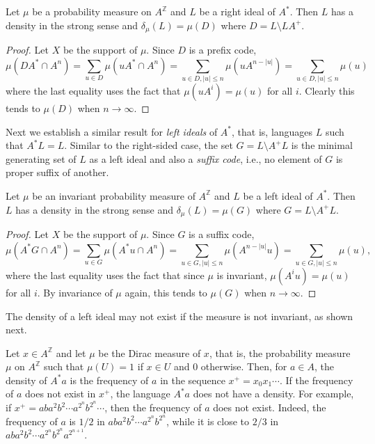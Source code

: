 \documentclass[a4paper,UKenglish,numberwithinsect,cleveref]{lipics-v2021}
\newcommand{\Z}{\mathbb{Z}}
\begin{document}
\begin{proposition}\label{propositionRightIdeal}
    Let $\mu$ be a probability measure on $A^\Z$ and $L$ be a right ideal of $A^*$. Then
    $L$ has a density in the strong sense and $\delta_\mu(L)=\mu(D)$ where $D = L\setminus LA^+$.
\end{proposition}

\begin{proof}
    Let $X$ be the support of $\mu$. Since $D$ is a prefix code,
    \begin{equation*}
            \mu(DA^*\cap A^n)=\sum_{u\in D}\mu(uA^*\cap A^n)=\sum_{u\in D, |u|\le n}\mu(uA^{n-|u|})=\sum_{u\in D,|u|\le n}\mu(u)
    \end{equation*}
    where the last equality uses the fact that $\mu(uA^i) = \mu(u)$ for all $i$. Clearly this tends to $\mu(D)$ when $n\to\infty$.
\end{proof}

Next we establish a similar result for {\em left ideals} of $A^*$, that is, languages $L$ such that $A^*L=L$. Similar to the right-sided case, the set $G = L\setminus A^+L$ is the minimal generating set of $L$ as a left ideal and also a \emph{suffix code}, i.e., no element of $G$ is proper suffix of another. 
\begin{proposition}\label{propositionLeftIdeal}
    Let $\mu$ be an invariant probability measure of $A^\Z$ and $L$ be a left ideal of $A^*$. Then
    $L$ has a density in the strong sense and $\delta_\mu(L)=\mu(G)$ where $G = L\setminus A^+L$.
\end{proposition}

\begin{proof}
    Let $X$ be the support of $\mu$. Since $G$ is a suffix code,
  \begin{equation*}
    \mu(A^*G\cap A^n)=\sum_{u\in G}\mu(A^*u\cap A^n)=
    \sum_{u\in G,|u|\le n}\mu(A^{n-|u|}u)=\sum_{u\in G,|u|\le n}\mu(u),
  \end{equation*}
  where the last equality uses the fact that since $\mu$ is invariant, $\mu(A^iu) = \mu(u)$ for all $i$. By invariance of $\mu$ again, this tends to $\mu(G)$ when $n\to\infty$.
\end{proof}

The density of a left ideal may not exist if the measure is not invariant, as shown next.

\begin{example}\label{exampleNotInvariant}
    Let $x\in A^\Z$ and let $\mu$ be the Dirac measure of $x$, that is, the probability measure $\mu$ on $A^\Z$ such that $\mu(U)=1$ if $x\in U$ and $0$ otherwise. Then, for $a\in A$, the density of $A^*a$ is the frequency of $a$ in the sequence $x^+=x_0x_1\cdots$. If the frequency of $a$ does not exist in $x^+$, the language $A^*a$ does not have a density.  For example, if $x^+=aba^2b^2\cdots a^{2^n}b^{2^n}\cdots$, then the frequency of $a$ does not exist. Indeed, the frequency of $a$ is $1/2$ in $aba^2b^2\cdots a^{2^n}b^{2^n}$, while it is close to $2/3$ in $aba^2b^2\cdots a^{2^n}b^{2^n}a^{2^{n+1}}$.
\end{example}
\end{document}
